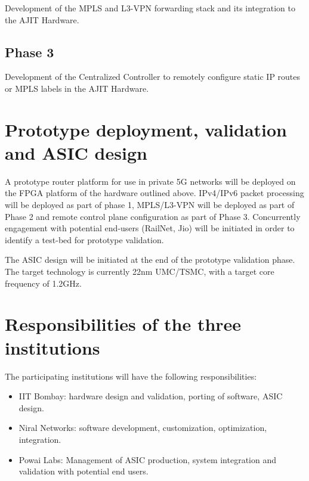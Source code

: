 \documentclass{article}
\begin{document}
Development of the MPLS and L3-VPN forwarding stack and its integration to the AJIT Hardware.

\subsection{Phase 3}

Development of the Centralized Controller to remotely configure static IP routes or MPLS labels 
in the AJIT Hardware.

\section{Prototype deployment, validation and ASIC design}

A prototype router platform for use in private 5G networks will be deployed on the FPGA platform of 
the hardware outlined above. IPv4/IPv6 packet processing will be deployed as
part of phase 1, MPLS/L3-VPN will be deployed as part of Phase 2 and remote control plane 
configuration as part of Phase 3.  Concurrently engagement with potential end-users
(RailNet, Jio) will be initiated in order to identify a test-bed for prototype validation.

The ASIC design will be initiated at the end of the prototype validation phase.   The
target technology is currently 22nm UMC/TSMC, with a target core frequency of 1.2GHz.



\section{Responsibilities of the three institutions}

The participating institutions will have the following
responsibilities:
\begin{itemize}
\item IIT Bombay:  hardware design and validation, porting of software, ASIC design.
\item Niral Networks:  software development, customization, optimization, integration.
\item Powai Labs:  Management of ASIC production, system integration and validation with
potential end users.
\end{itemize}
\end{document}
